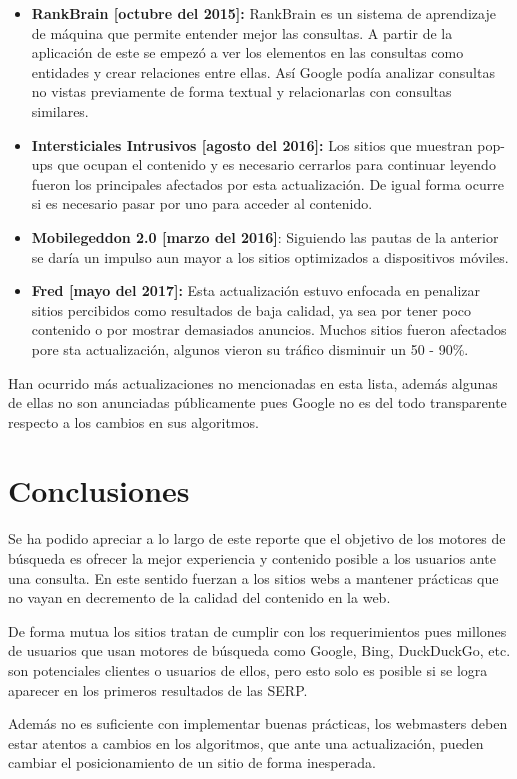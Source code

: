 \documentclass[12pt]{llncs}
\begin{document}
\begin{itemize}
\item \textbf{RankBrain [octubre del 2015]:} RankBrain es un sistema de aprendizaje de máquina que permite entender mejor las consultas. A partir de la aplicación de este se empezó a ver los elementos en las consultas como entidades y crear relaciones entre ellas. Así Google podía analizar consultas no vistas previamente de forma textual y relacionarlas con consultas similares.

\item \textbf{Intersticiales Intrusivos [agosto del 2016]:} Los sitios que muestran pop-ups que ocupan el contenido y es necesario cerrarlos para continuar leyendo fueron los principales afectados por esta actualización. De igual forma ocurre si es necesario pasar por uno para acceder al contenido.

\item \textbf{Mobilegeddon 2.0 [marzo del 2016]}: Siguiendo las pautas de la anterior se daría un impulso aun mayor a los sitios optimizados a dispositivos móviles. \cite{mobilgeddon2}

\item \textbf{Fred [mayo del 2017]:} Esta actualización estuvo enfocada en penalizar sitios percibidos como resultados de baja calidad, ya sea por tener poco contenido o por mostrar demasiados anuncios. Muchos sitios fueron afectados pore sta actualización, algunos vieron su tráfico disminuir un 50 - 90\%. \cite{fred}

\end{itemize}

Han ocurrido más actualizaciones no mencionadas en esta lista, además algunas de ellas no son anunciadas públicamente pues Google no es del todo transparente respecto a los cambios en sus algoritmos.

\section{Conclusiones}

Se ha podido apreciar a lo largo de este reporte que el objetivo de los motores de búsqueda es ofrecer la mejor experiencia y contenido posible a los usuarios ante una consulta. En este sentido fuerzan a los sitios webs a mantener prácticas que no vayan en decremento de la calidad del contenido en la web.

De forma mutua los sitios tratan de cumplir con los requerimientos pues millones de usuarios que usan motores de búsqueda como Google, Bing, DuckDuckGo, etc. son potenciales clientes o usuarios de ellos, pero esto solo es posible si se logra aparecer en los primeros resultados de las SERP.

Además no es suficiente con implementar buenas prácticas, los webmasters deben estar atentos a cambios en los algoritmos, que ante una actualización, pueden cambiar el posicionamiento de un sitio de forma inesperada.

 

\end{document}

